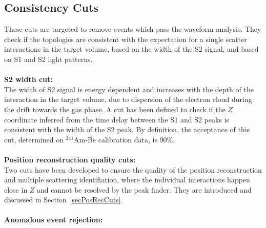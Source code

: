 \subsection {Consistency Cuts}
\label{secConsistencyCuts}
These cuts are targeted to remove events which pass the waveform analysis. They check if the topologies are consistent with the expectation for a single scatter interactions in the target volume, based on the width of the S2 signal, and based on S1 and S2 light patterns. \\
\\
{\bf S2 width cut:}\\
The width of S2 signal is energy dependent and increases with the depth of the interaction in the target volume, due to dispersion of the electron cloud during the drift towards the gas phase. A cut has been defined to check if the $Z$ coordinate inferred from the time delay between the S1 and S2 peaks is consistent with the width of the S2 peak. By definition, the acceptance of this cut, determined on $^{241}$Am-Be calibration data, is 90\%.
\\
\\
{\bf Position reconstruction quality cuts:}\\
Two cuts have been developed to ensure the quality of the position reconstruction and multiple scattering identifiation, where the individual interactions happen close in $Z$ and cannot be resolved by the peak finder. They are introduced and discussed in Section~\ref{secPosRecCuts}.
\\
\\
{\bf Anomalous event rejection:}

